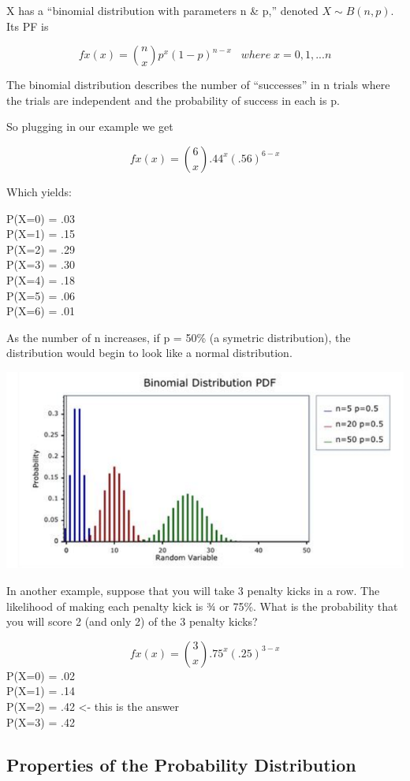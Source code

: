 \documentclass[]{book}
\theoremstyle{definition}
\theoremstyle{definition}
\theoremstyle{definition}
\theoremstyle{remark}
\begin{document}
X has a ``binomial distribution with parameters n \& p,'' denoted
\(X \sim B(n,p)\). Its PF is

\[fx(x)=  \binom{n}{x} p^x (1-p)^{n-x} \; \; \; where \; x= 0,1,...n\]

The binomial distribution describes the number of ``successes'' in n
trials where the trials are independent and the probability of success
in each is p.

So plugging in our example we get

\[fx(x)=  \binom{6}{x} .44^x (.56)^{6-x}\]

Which yields:

P(X=0) = .03\\
P(X=1) = .15\\
P(X=2) = .29\\
P(X=3) = .30\\
P(X=4) = .18\\
P(X=5) = .06\\
P(X=6) = .01

As the number of n increases, if p = 50\% (a symetric distribution), the
distribution would begin to look like a normal distribution.

\includegraphics[width=1\linewidth]{images/binomial}

In another example, suppose that you will take 3 penalty kicks in a row.
The likelihood of making each penalty kick is ¾ or 75\%. What is the
probability that you will score 2 (and only 2) of the 3 penalty kicks?

\[fx(x)=  \binom{3}{x} .75^x (.25)^{3-x}\] P(X=0) = .02\\
P(X=1) = .14\\
P(X=2) = .42 \textless{}- this is the answer\\
P(X=3) = .42

\subsection{Properties of the Probability
Distribution}\label{properties-of-the-probability-distribution}
\end{document}
